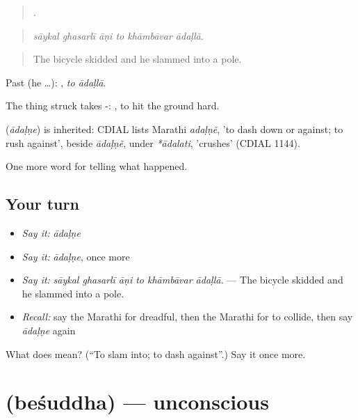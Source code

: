 \begin{quote}
     .
\end{quote}

\begin{quote}
\emph{sāykal ghasarlī āṇi to khāmbāvar ādaḷlā.}
\end{quote}

\begin{quote}
The bicycle skidded and he slammed into a pole.
\end{quote}

Past (he …):  , \emph{to ādaḷlā}.

The thing struck takes -:  , to hit the ground hard.

\begin{cousinweb}
\textbf{} (\emph{ādaḷṇe}) is inherited: CDIAL lists Marathi \emph{adaḷṇẽ}, 'to dash down or against; to rush against', beside \emph{ādaḷṇẽ}, under \emph{*ādalati}, 'crushes' (CDIAL 1144).
\end{cousinweb}

\begin{grammarlens}[title={What you've built}]
One more word for telling what happened.
\end{grammarlens}

\subsection*{Your turn}
\begin{itemize}
\raggedright
  \item \emph{Say it:} \emph{ādaḷṇe}
  \item \emph{Say it:} \emph{ādaḷṇe}, once more
  \item \emph{Say it:} \emph{sāykal ghasarlī āṇi to khāmbāvar ādaḷlā.} — The bicycle skidded and he slammed into a pole.
  \item \emph{Recall:} say the Marathi for dreadful, then the Marathi for to collide, then say \emph{ādaḷṇe} again
\end{itemize}

\begin{tcolorbox}[breakable,colback=teal!4,colframe=teal!35!black,title={Before you move on}]
What does  mean? (\textquotedblleft{}To slam into; to dash against\textquotedblright{}.) Say it once more.
\end{tcolorbox}
\section[\texorpdfstring{\mr{बेशुद्ध} (beśuddha)}{बेशुद्ध (beśuddha)}]{ (beśuddha) — unconscious}

